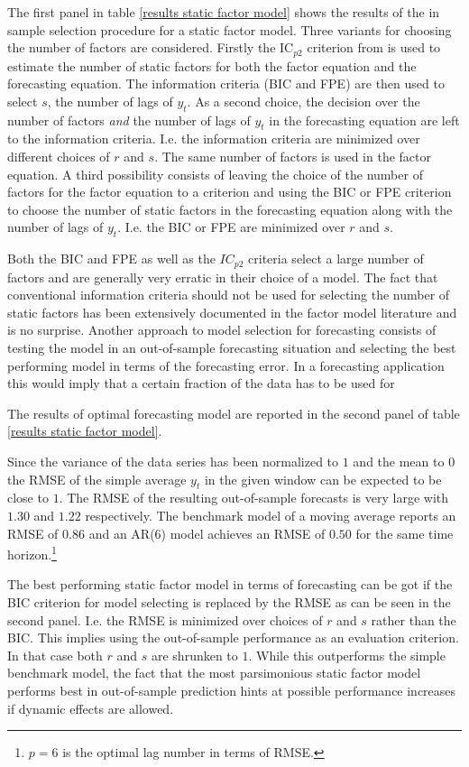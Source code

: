 \documentclass[12pt]{article}
\begin{document}
The first panel in table \ref{results static factor model} shows the results of the in sample selection procedure for a static factor model. Three variants for choosing the number of factors are considered. Firstly the IC$_{p2}$ criterion from \citet{bai2002determining} is used to estimate the number of static factors for both the factor equation and the forecasting equation. The information criteria (BIC and FPE) are then used to select $s$, the number of lags of $y_t$.
As a second choice, the decision over the number of factors \textit{and} the number of lags of $y_t$ in the forecasting equation are left to the information criteria. I.e. the information criteria are minimized over different choices of $r$ and $s$. The same number of factors is used in the factor equation.
A third possibility consists of leaving the choice of the number of factors for the factor equation to a \citet{bai2002determining} criterion and using the BIC or FPE criterion to choose the number of static factors in the forecasting equation along with the number of lags of $y_t$. I.e. the BIC or FPE are minimized over $r$ and $s$.

Both the BIC and FPE as well as the $IC_{p2}$ criteria select a large number of factors and are generally very erratic in their choice of a model. The fact that conventional information criteria should not be used for selecting the number of static factors has been extensively documented in the factor model literature and is no surprise. Another approach to model selection for forecasting consists of testing the model in an out-of-sample forecasting situation and selecting the best performing model in terms of the forecasting error. In a forecasting application this would imply that a certain fraction of the data has to be used for 

The results of optimal forecasting model are reported in the second panel of table \ref{results static factor model}.

Since the variance of the data series has been normalized to $1$ and the mean to $0$ the RMSE of the simple average $y_t$ in the given window can be expected to be close to $1$. The RMSE of the resulting out-of-sample forecasts is very large with $1.30$ and $1.22$ respectively. The benchmark model of a moving average reports an RMSE of $0.86$ and an AR(6) model achieves an RMSE of $0.50$ for the same time horizon.\footnote{$p=6$ is the optimal lag number in terms of RMSE.}

The best performing static factor model in terms of forecasting can be got if the BIC criterion for model selecting is replaced by the RMSE as can be seen in the second panel. I.e. the RMSE is minimized over choices of $r$ and $s$ rather than the BIC. This implies using the out-of-sample performance as an evaluation criterion. In that case both $r$ and $s$ are shrunken to $1$. While this outperforms the simple benchmark model, the fact that the most parsimonious static factor model performs best in out-of-sample prediction hints at possible performance increases if dynamic effects are allowed.
\end{document}
